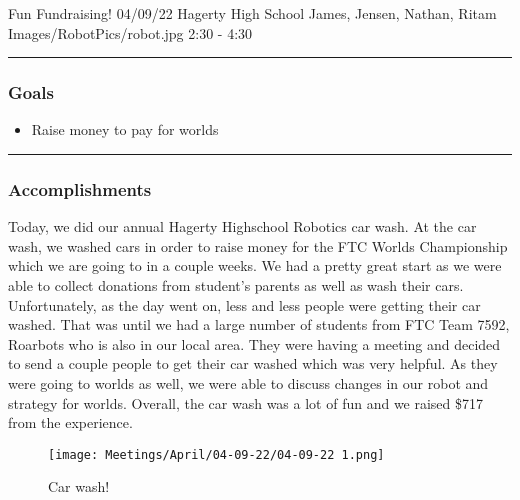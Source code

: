 \insertmeeting 
	{Fun Fundraising!} 
	{04/09/22} 
	{Hagerty High School}
	{James, Jensen, Nathan, Ritam}
	{Images/RobotPics/robot.jpg}
	{2:30 - 4:30}
	
\noindent\hfil\rule{\textwidth}{.4pt}\hfil
\subsubsection*{Goals}
\begin{itemize}
    \item Raise money to pay for worlds

\end{itemize} 

\noindent\hfil\rule{\textwidth}{.4pt}\hfil

\subsubsection*{Accomplishments}
Today, we did our annual Hagerty Highschool Robotics car wash. At the car wash, we washed cars in order to raise money for the FTC Worlds Championship which we are going to in a couple weeks. We had a pretty great start as we were able to collect donations from student's parents as well as wash their cars. Unfortunately, as the day went on, less and less people were getting their car washed. That was until we had a large number of students from FTC Team 7592, Roarbots who is also in our local area. They were having a meeting and decided to send a couple people to get their car washed which was very helpful. As they were going to worlds as well, we were able to discuss changes in our robot and strategy for worlds. Overall, the car wash was a lot of fun and we raised \$717 from the experience. 

\begin{figure}[htp]
\centering
\texttt{[image: Meetings/April/04-09-22/04-09-22 1.png]}
\caption{Car wash!}
\label{fig:041322_1}
\end{figure}



